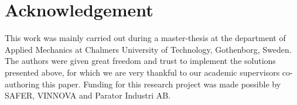 \documentclass[root.tex]{subfiles}
\begin{document}
{\pagestyle{empty}}
\section{Acknowledgement}
\label{chap:Acknowledgement}
This work was mainly carried out during a master-thesis at the department of Applied Mechanics at Chalmers University of Technology, Gothenborg, Sweden\cite{franzreal}. The authors were given great freedom and trust to implement the solutions presented above, for which we are very thankful to our academic supervisors co-authoring this paper. Funding for this research project was made possible by SAFER\cite{safer}, VINNOVA\cite{vinnova} and Parator Industri AB\cite{paratorAB}.
\end{document}
